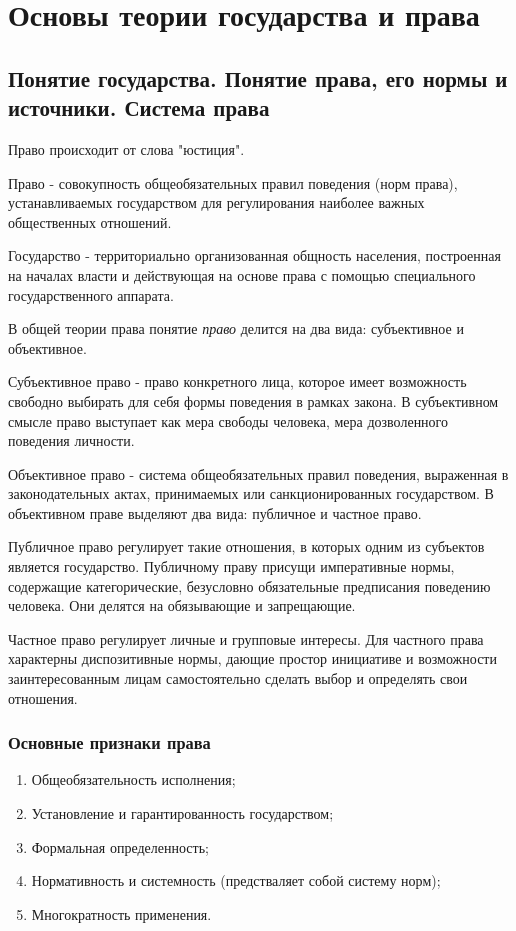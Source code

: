 \section{Основы теории государства и права}

\subsection{Понятие государства. Понятие права, его нормы и источники. Система права}

Право происходит от слова "юстиция".

Право - совокупность общеобязательных правил поведения (норм права), устанавливаемых государством для регулирования наиболее важных общественных отношений.

Государство - территориально организованная общность населения, построенная на началах власти и действующая на основе права с помощью специального государственного аппарата.

В общей теории права понятие \textit{право} делится на два вида: субъективное и объективное.

Субъективное право - право конкретного лица, которое имеет возможность свободно выбирать для себя формы поведения в рамках закона. В субъективном смысле право выступает как мера свободы человека, мера дозволенного поведения личности.

Объективное право - система общеобязательных правил поведения, выраженная в законодательных актах, принимаемых или санкционированных государством. В объективном праве выделяют два вида: публичное и частное право.

Публичное право регулирует такие отношения, в которых одним из субъектов является государство. Публичному праву присущи императивные нормы, содержащие категорические, безусловно обязательные предписания поведению человека. Они делятся на обязывающие и запрещающие.

Частное право регулирует личные и групповые интересы. Для частного права характерны диспозитивные нормы, дающие простор инициативе и возможности заинтересованным лицам самостоятельно сделать выбор и определять свои отношения.

\subsubsection{Основные признаки права}
\begin{enumerate}
	\item Общеобязательность исполнения;
	\item Установление и гарантированность государством;
	\item Формальная определенность;
	\item Нормативность и системность (предстваляет собой систему норм);
	\item Многократность применения.
\end{enumerate}

